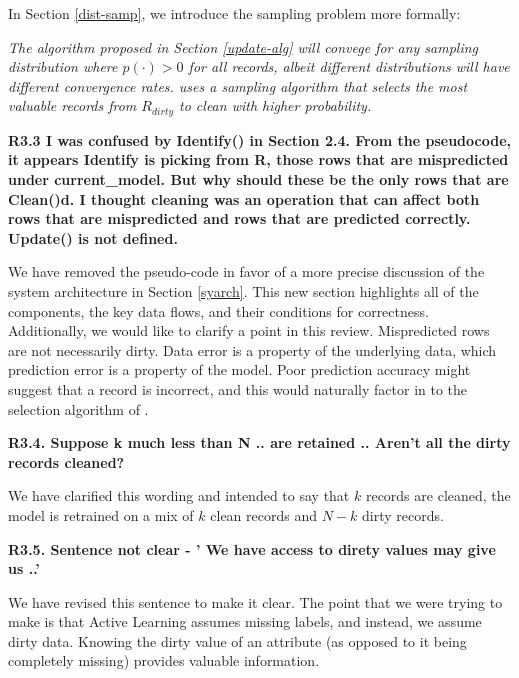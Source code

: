 \vspace{0.5em}

In Section \ref{dist-samp}, we introduce the sampling problem more formally:

\emph{The algorithm proposed in Section \ref{update-alg} will convege for 
any sampling distribution where  $p(\cdot) > 0$ for all records, albeit different distributions will have different convergence rates.
\sys uses a sampling algorithm that selects the most valuable records from $R_{dirty}$ to clean with higher probability.}

\vspace{0.5em}

\noindent \textbf{R3.3 I was confused by Identify() in Section 2.4.
From the pseudocode, it appears Identify is picking from R,
those rows that are mispredicted under current\_model.
But why should these be the only rows that are Clean()d.
I thought cleaning was an operation that can
affect both rows that are mispredicted and rows that
are predicted correctly. Update() is not defined.}

\noindent  We have removed the pseudo-code in favor of a more precise discussion of the system architecture in Section \ref{syarch}. This new section highlights all of the components, the key data flows, and their conditions for correctness. Additionally, we would like to clarify a point in this review. Mispredicted rows are not necessarily dirty. Data error is a property of the underlying data, which prediction error is a property of the model. Poor prediction accuracy might suggest that a record is incorrect, and this would naturally factor in to the selection algorithm of \sys.

\vspace{0.5em}

\noindent \textbf{R3.4. Suppose k much less than N .. are retained .. Aren't all
the dirty records cleaned?}

\noindent  We have clarified this wording and intended to say that $k$ records are cleaned, the model is retrained on a mix of $k$ clean records and $N-k$ dirty records.

\vspace{0.5em}

\noindent\textbf{R3.5. Sentence not clear - ' We have access to direty
values may give us ..'}

 \noindent We have revised this sentence to make it clear. The point that we were trying to make is that Active Learning assumes missing labels, and instead, we assume dirty data. Knowing the dirty value of an attribute (as opposed to it being completely missing) provides valuable information.

